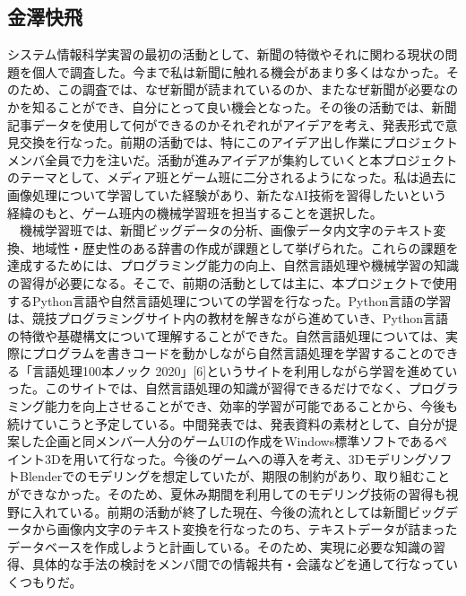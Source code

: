 \subsection{金澤快飛}
システム情報科学実習の最初の活動として、新聞の特徴やそれに関わる現状の問題を個人で調査した。今まで私は新聞に触れる機会があまり多くはなかった。そのため、この調査では、なぜ新聞が読まれているのか、またなぜ新聞が必要なのかを知ることができ、自分にとって良い機会となった。その後の活動では、新聞記事データを使用して何ができるのかそれぞれがアイデアを考え、発表形式で意見交換を行なった。前期の活動では、特にこのアイデア出し作業にプロジェクトメンバ全員で力を注いだ。活動が進みアイデアが集約していくと本プロジェクトのテーマとして、メディア班とゲーム班に二分されるようになった。私は過去に画像処理について学習していた経験があり、新たなAI技術を習得したいという経緯のもと、ゲーム班内の機械学習班を担当することを選択した。\\
　機械学習班では、新聞ビッグデータの分析、画像データ内文字のテキスト変換、地域性・歴史性のある辞書の作成が課題として挙げられた。これらの課題を達成するためには、プログラミング能力の向上、自然言語処理や機械学習の知識の習得が必要になる。そこで、前期の活動としては主に、本プロジェクトで使用するPython言語や自然言語処理についての学習を行なった。Python言語の学習は、競技プログラミングサイト内の教材を解きながら進めていき、Python言語の特徴や基礎構文について理解することができた。自然言語処理については、実際にプログラムを書きコードを動かしながら自然言語処理を学習することのできる「言語処理100本ノック 2020」[6]というサイトを利用しながら学習を進めていった。このサイトでは、自然言語処理の知識が習得できるだけでなく、プログラミング能力を向上させることができ、効率的学習が可能であることから、今後も続けていこうと予定している。中間発表では、発表資料の素材として、自分が提案した企画と同メンバ一人分のゲームUIの作成をWindows標準ソフトであるペイント3Dを用いて行なった。今後のゲームへの導入を考え、3DモデリングソフトBlenderでのモデリングを想定していたが、期限の制約があり、取り組むことができなかった。そのため、夏休み期間を利用してのモデリング技術の習得も視野に入れている。前期の活動が終了した現在、今後の流れとしては新聞ビッグデータから画像内文字のテキスト変換を行なったのち、テキストデータが詰まったデータベースを作成しようと計画している。そのため、実現に必要な知識の習得、具体的な手法の検討をメンバ間での情報共有・会議などを通して行なっていくつもりだ。


